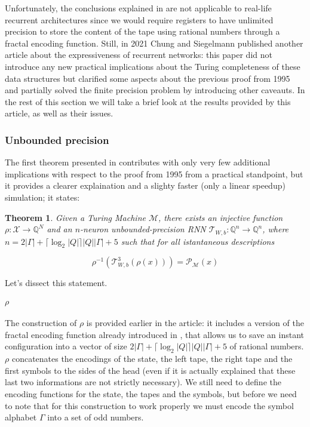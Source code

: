 \documentclass{article}
\newtheorem{theorem}{Theorem}
\begin{document}
Unfortunately, the conclusions explained in \cite{SIE95} are not applicable to real-life recurrent architectures since we would require registers to have unlimited precision to store the content of the tape using rational numbers through a fractal encoding function.
Still, in 2021 Chung and Siegelmann published another article \cite{CHU21} about the expressiveness of recurrent networks: this paper did not introduce any new practical implications about the Turing completeness of these data structures but clarified some aspects about the previous proof from 1995 and partially solved the finite precision problem by introducing other caveauts. In the rest of this section we will take a brief look at the results provided by this article, as well as their issues.

\subsubsection{Unbounded precision}

The first theorem presented in \cite{CHU21} contributes with only very few additional implications with respect to the proof from 1995 from a practical standpoint, but it provides a clearer explaination and a slighty faster (only a linear speedup) simulation; it states:

\begin{theorem}\label{th:theorem1}
    Given a Turing Machine $\mathcal{M}$, there exists an injective function $\rho: \mathcal{X} \rightarrow \mathbb{Q}^N$ and an $n$-neuron unbounded-precision RNN $\mathcal{T}_{W,b}: \mathbb{Q}^n \rightarrow \mathbb{Q}^n$, where $n=2|\Gamma|+\lceil \log_2|Q|\rceil |Q||\Gamma| + 5$ such that for all istantaneous descriptions
    
    $$\rho^{-1}(\mathcal{T}^3_{W,b}(\rho(x))) = \mathcal{P}_{\mathcal{M}}(x)$$
\end{theorem}

Let's dissect this statement.

\paragraph{$\rho$}
The construction of $\rho$ is provided earlier in the article: it includes a version of the fractal encoding function already introduced in \cite{SIE95}, that allows us to save an instant configuration into a vector of size $2|\Gamma|+\lceil \log_2|Q|\rceil |Q||\Gamma| + 5$ of rational numbers. $\rho$ concatenates the encodings of the state, the left tape, the right tape and the first symbols to the sides of the head (even if it is actually explained that these last two informations are not strictly necessary). We still need to define the encoding functions for the state, the tapes and the symbols, but before we need to note that for this construction to work properly we must encode the symbol alphabet $\Gamma$ into a set of odd numbers.
\end{document}
